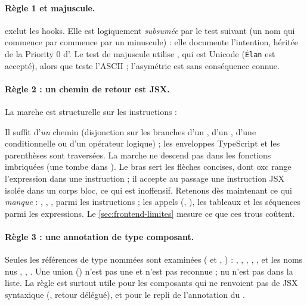 \paragraph{Règle 1 et majuscule.}  exclut les hooks. Elle est logiquement \emph{subsumée} par le test suivant (un nom qui commence par  commence par un  minuscule) : elle documente l'intention, héritée de la \og Priority 0\fg{} d'. Le test de majuscule utilise , qui est Unicode (\texttt{Élan} est accepté), alors que  teste l'ASCII ; l'asymétrie est sans conséquence connue.

\paragraph{Règle 2 : un chemin de retour est JSX.} La marche est structurelle sur les instructions :



Il suffit d'\emph{un} chemin (disjonction sur les branches d'un , d'un , d'une conditionnelle ou d'un opérateur logique) ; les enveloppes TypeScript et les parenthèses sont traversées. La marche ne descend pas dans les fonctions imbriquées (une  tombe dans ). Le bras  sert les flèches concises, dont oxc range l'expression dans une instruction ; il accepte au passage une instruction JSX isolée dans un corps bloc, ce qui est inoffensif. Retenons dès maintenant ce qui \emph{manque} : , , ,  parmi les instructions ; les appels (, ), les tableaux et les séquences parmi les expressions. Le \cref{sec:frontend-limites} mesure ce que ces trous coûtent.

\paragraph{Règle 3 : une annotation de type composant.} Seules les références de type nommées sont examinées ( et , ) : , , , , , et les noms nus , , . Une union () n'est pas une  et n'est pas reconnue ;  nu n'est pas dans la liste. La règle est surtout utile pour les composants qui ne renvoient pas de JSX syntaxique (, retour délégué), et pour le repli de l'annotation du .

